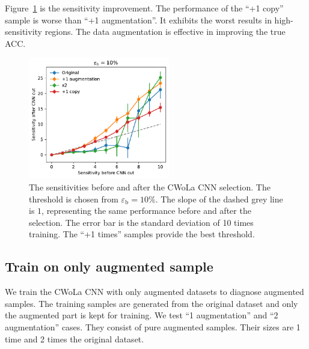 \documentclass[12pt]{article}
\begin{document}
            Figure~\ref{fig:sensitivity_improvement_bkg_eff_01_copy_1} is the sensitivity improvement. The performance of the ``+1 copy'' sample is worse than ``+1 augmentation''. It exhibits the worst results in high-sensitivity regions. The data augmentation is effective in improving the true ACC.
            \begin{figure}[htpb]
                \centering
                \includegraphics[width=0.55\textwidth]{HVmodel_sensitivity_improvement_bkg_eff_10_copy_1.pdf}
                \caption{The sensitivities before and after the CWoLa CNN selection. The threshold is chosen from $\varepsilon_{\text{b}} = 10\%$. The slope of the dashed grey line is $1$, representing the same performance before and after the selection. The error bar is the standard deviation of 10 times training. The ``+1 times'' samples provide the best threshold.}
                \label{fig:sensitivity_improvement_bkg_eff_01_copy_1}
            \end{figure}
    \subsection{Train on only augmented sample}%
    \label{sub:train_on_only_augmented_sample}
        We train the CWoLa CNN with only augmented datasets to diagnose augmented samples. The training samples are generated from the original dataset and only the augmented part is kept for training. We test ``1 augmentation'' and ``2 augmentation'' cases. They consist of pure augmented samples. Their sizes are 1 time and 2 times the original dataset.
\end{document}
